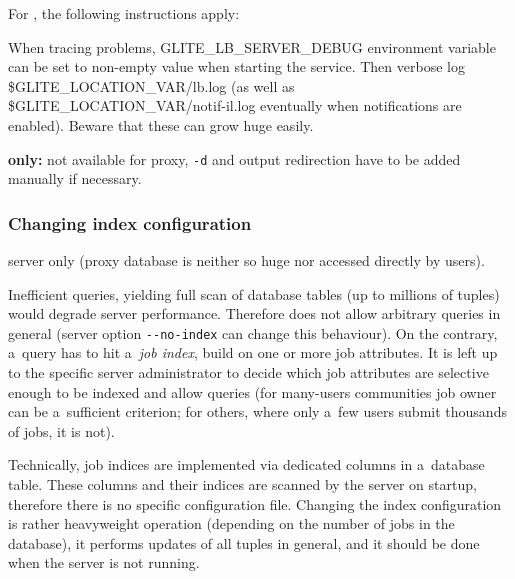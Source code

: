 For , the following instructions apply:

\begin{sloppypar}
When tracing problems, GLITE\_LB\_SERVER\_DEBUG environment variable can be set to
non-empty value when starting the service.
Then verbose log \$GLITE\_LOCATION\_VAR/lb.log 
(as well as \$GLITE\_LOCATION\_VAR/notif-il.log eventually when notifications are enabled).
Beware that these can grow huge easily.
\end{sloppypar}

\textbf{ only:} not available for \LB proxy, \verb'-d' and output redirection
have to be added manually if necessary.

\subsubsection{Changing index configuration}
\label{maintain:index}

\LB server only (\LB proxy database is neither so huge nor accessed directly by users).

Inefficient queries, yielding full scan of \LB database tables (up to millions of tuples) would degrade server performance.
Therefore \LB does not allow arbitrary queries in general
(server option \verb'--no-index' can change this behaviour).
On the contrary, a~query has to hit a~\emph{job index}, build on one or
more job attributes.
It is left up to the specific \LB server administrator to decide
which job attributes are selective enough to be indexed and allow queries
(\eg for many-users communities job owner can be a~sufficient criterion;
for others, where only a~few users submit thousands of jobs, it is not).

Technically, job indices are implemented via dedicated columns
in a~database table.
These columns and their indices are scanned by the \LB server on startup,
therefore there is no specific configuration file.
Changing the index configuration is rather heavyweight operation
(depending on the number of jobs in the database), it performs
updates of all tuples in general, and it should be done when the server is not
running.

